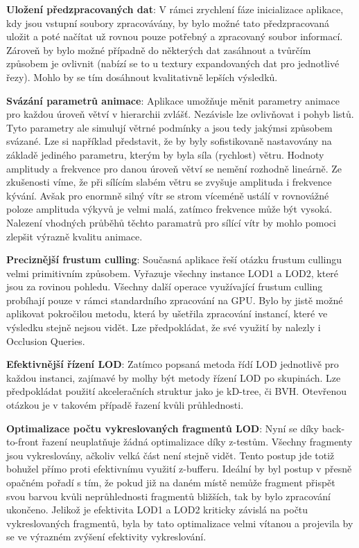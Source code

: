 {\bf Uložení předzpracovaných dat}: 
V rámci zrychlení fáze inicializace aplikace, kdy jsou vstupní soubory zpracovávány, by bylo možné tato předzpracovaná uložit a poté načítat už rovnou pouze potřebný a zpracovaný soubor informací. Zároveň by bylo možné případně do některých dat zasáhnout a tvůrčím způsobem je ovlivnit (nabízí se to u textury expandovaných dat pro jednotlivé řezy). Mohlo by se tím dosáhnout kvalitativně lepších výsledků.

{\bf  Svázání parametrů animace}: 
Aplikace umožňuje měnit parametry animace pro každou úroveň větví v hierarchii zvlášť. Nezávisle lze ovlivňovat i pohyb listů. Tyto parametry ale simulují větrné podmínky a jsou tedy jakýmsi způsobem svázané. Lze si například představit, že by byly sofistikovaně nastavovány na základě jediného parametru, kterým by byla síla (rychlost) větru. Hodnoty amplitudy a frekvence pro danou úroveň větví se nemění rozhodně lineárně. Ze zkušenosti víme, že při sílícím slabém větru se zvyšuje amplituda i frekvence kývání. Avšak pro enormně silný vítr se strom víceméně ustálí v rovnovážné poloze amplituda výkyvů je velmi malá, zatímco frekvence může být vysoká. Nalezení vhodných průběhů těchto paramatrů pro sílící vítr by mohlo pomoci zlepšit výrazně kvalitu animace.

{\bf  Preciznější frustum culling}: 
Současná aplikace řeší otázku frustum cullingu velmi primitivním způsobem. Vyřazuje všechny instance LOD1 a LOD2, které jsou za rovinou pohledu. Všechny další operace využívající frustum culling probíhají pouze v rámci standardního zpracování na GPU. Bylo by jistě možné aplikovat pokročilou metodu, která by ušetřila zpracování instancí, které ve výsledku stejně nejsou vidět. Lze předpokládat, že své využití by nalezly i Occlusion Queries.

{\bf  Efektivnější řízení LOD}: 
Zatímco popsaná metoda řídí LOD jednotlivě pro každou instanci, zajímavé by molhy být metody řízení LOD po skupinách. Lze předpokládat použití akceleračních struktur jako je kD-tree, či BVH. Otevřenou otázkou je v takovém případě řazení kvůli průhlednosti.

{\bf  Optimalizace počtu vykreslovaných fragmentů LOD}: 
Nyní se díky back-to-front řazení neuplatňuje žádná optimalizace díky z-testům. Všechny fragmenty jsou vykreslovány, ačkoliv velká část není stejně vidět. Tento postup jde totiž bohužel přímo proti efektivnímu využití z-bufferu. Ideální by byl postup v přesně opačném pořadí s tím, že pokud již na daném místě nemůže fragment přispět svou barvou kvůli neprůhlednosti fragmentů bližších, tak by bylo zpracování ukončeno. Jelikož je efektivita LOD1 a LOD2 kriticky závislá na počtu vykreslovaných fragmentů, byla by tato optimalizace velmi vítanou a projevila by se ve výrazném zvýšení efektivity vykreslování.

